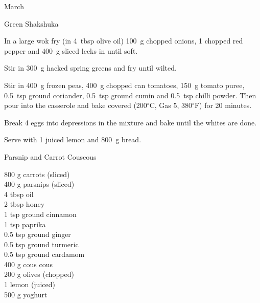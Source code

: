 \begin{menu}{March}
\begin{recipe}{2}{Green Shakshuka}
    \begin{instructions}
    \item 
        In a large wok fry
        (in 4~tbsp  olive oil)
        100~g chopped onions,
        1 chopped red pepper
        and
        400~g sliced leeks
        in until soft.
      \item 
        Stir in 300~g hacked spring greens
        and fry until wilted.
      \item 
        Stir in 400~g  frozen peas,
        400~g chopped can tomatoes,
        150~g  tomato puree,
        0.5~tsp  ground coriander,
        0.5~tsp  ground cumin
        and
        0.5~tsp  chilli powder.
        Then pour into the casserole
        and bake covered (200$^{\circ}$C, Gas 5, 380$^{\circ}$F) for 20 minutes.
      \item 
        Break 4  eggs into depressions in the mixture
        and bake until the whites are done.
      \item 
        Serve with
        1 juiced lemon
        and
        800~g  bread.
      
    \end{instructions}
    \end{recipe}%
  
    \begin{recipe}{2}{Parsnip and Carrot Couscous}%
		\begin{ingredients}
		800 g carrots (sliced) \\
	400 g parsnips (sliced) \\
	4 tbsp oil  \\
	2 tbsp honey  \\
	1 tsp ground cinnamon  \\
	1 tsp paprika  \\
	0.5 tsp ground ginger  \\
	0.5 tsp ground turmeric  \\
	0.5 tsp ground cardamom  \\
	400 g cous cous  \\
	200 g olives (chopped) \\
	1  lemon (juiced) \\
	500 g yoghurt  \\
	
		\end{ingredients}
	
	

\end{recipe}
\end{menu}
